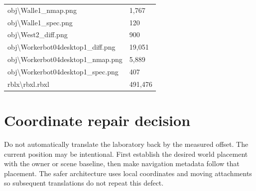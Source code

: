 \begin{longtable}{p{}p{}}
obj\textbackslash{}\allowbreak{}Walle1\_\allowbreak{}nmap.\allowbreak{}png & 1,767 \\
obj\textbackslash{}\allowbreak{}Walle1\_\allowbreak{}spec.\allowbreak{}png & 120 \\
obj\textbackslash{}\allowbreak{}West2\_\allowbreak{}diff.\allowbreak{}png & 900 \\
obj\textbackslash{}\allowbreak{}Workerbot04desktop1\_\allowbreak{}diff.\allowbreak{}png & 19,051 \\
obj\textbackslash{}\allowbreak{}Workerbot04desktop1\_\allowbreak{}nmap.\allowbreak{}png & 5,889 \\
obj\textbackslash{}\allowbreak{}Workerbot04desktop1\_\allowbreak{}spec.\allowbreak{}png & 407 \\
rblx\textbackslash{}\allowbreak{}rbxl.\allowbreak{}rbxl & 491,476 \\
\bottomrule
\end{longtable}
\section{Coordinate repair decision}
Do not automatically translate the laboratory back by the measured offset.\allowbreak{} The current position may be intentional.\allowbreak{} First establish the desired world placement with the owner or scene baseline, then make navigation metadata follow that placement.\allowbreak{} The safer architecture uses local coordinates and moving attachments so subsequent translations do not repeat this defect.\allowbreak{}

